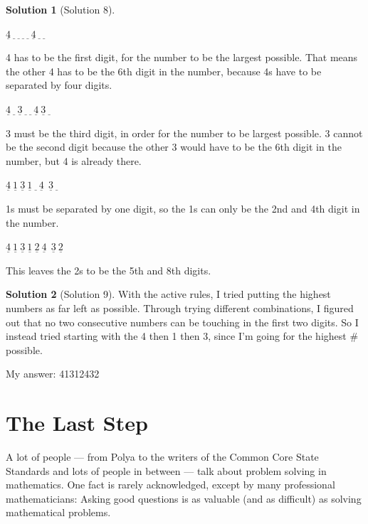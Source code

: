 \documentclass[10pt, reqno]{amsart}
\theoremstyle{remark}
\theoremstyle{definition}
\newtheorem*{sol*}{Solution}
\numberwithin{equation}{section}  %
\begin{document}
\begin{sol*}[Solution 8]\ 

$\underline{4} \ \underline{\ } \ \underline{\ } \ \underline{\ }\  \underline{\ }\  \underline{4} \ \underline{\ } \ \underline{\ }$

4 has to be the first digit, for the number to be the largest possible.  That means the other 4 has to be the 6th digit in the number, because 4s have to be separated by four digits.




$\underline{4} \ \underline{\ } \ \underline{3} \ \underline{\ }\  \underline{\ } \ \underline{4}  \ \underline{3 } \ \underline{\ }$

3 must be the third digit, in order for the number to be largest possible.  3 cannot be the second digit because the other 3 would have to be the 6th digit in the number, but 4 is already there.




$\underline{4} \ \underline{1} \ \underline{3} \ \underline{1 }\  \underline{\ } \  \underline{4}\   \ \underline{3 } \ \underline{\ }$

1s must be separated by one digit, so the 1s can only be the 2nd and 4th digit in the number.


$\underline{4} \ \underline{1} \ \underline{3} \ \underline{1 }\  \underline{2} \  \underline{4}\   \ \underline{3 } \ \underline{2 }$

This leaves the 2s to be the 5th and 8th digits.


\end{sol*}


\begin{sol*}[Solution 9]

With the active rules, I tried putting the highest numbers as far left as possible.  Through trying different combinations, I figured out that no two consecutive numbers can be touching in the first two digits.  So I instead tried starting with the 4 then 1 then 3, since I'm going for the highest \# possible.



My answer: 41312432


\end{sol*}


\section{The Last Step}
A lot of people --- from Polya to the writers of the Common Core State Standards and lots of people in between --- talk about problem solving in mathematics.  One fact is rarely acknowledged, except by many professional mathematicians: Asking good questions is as valuable (and as difficult) as solving mathematical problems.  
\end{document}
